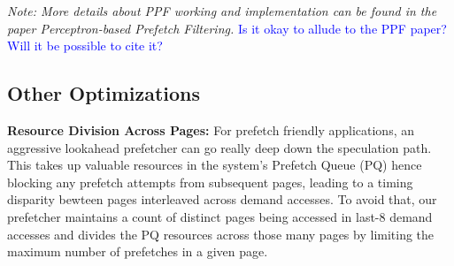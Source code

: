 \textit {Note: More details about PPF working and implementation can be found 
in the paper Perceptron-based Prefetch Filtering.}
\textcolor{blue}{Is it okay to allude to the PPF paper? Will it be possible to cite it?}

\subsection{Other Optimizations}
\label{Enhancements-Misc}

\noindent \textbf{Resource Division Across Pages:}
For prefetch friendly applications, an aggressive lookahead prefetcher can go really
deep down the speculation path. This takes up valuable resources in the system's Prefetch 
Queue (PQ) hence blocking any prefetch attempts from subsequent pages, leading to a timing
disparity bewteen pages interleaved across demand accesses. To avoid that, our prefetcher 
maintains a count of distinct pages being accessed in last-8 demand accesses and divides the
PQ resources across those many pages by limiting the maximum number of prefetches in a given 
page.
